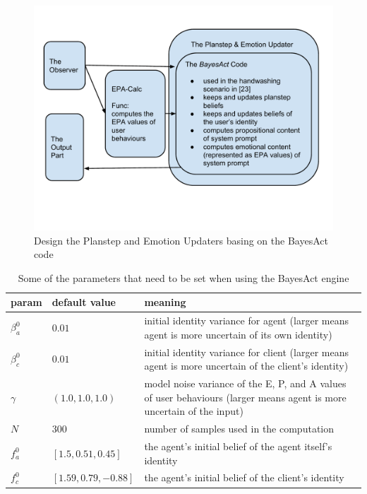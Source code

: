 \begin{figure}[htp]
\centering
\includegraphics[trim = 4mm 30mm 5mm 15mm, clip, width=0.9\linewidth]{fig/fig-updater.pdf}
\caption{Design the Planstep and Emotion Updaters basing on the BayesAct code}
\label{fig:updater}
\end{figure}


\begin{table}
\centering
\caption{Some of the parameters that need to be set when using the BayesAct engine}
\label{table:bayesact-param}
\begin{tabular}{| l | l | p{9.4cm} |}
\hline
param & default value & meaning \\ \hline
$\beta_{a}^{0}$ & $0.01$ & initial identity variance for agent (larger means agent is more uncertain of its own identity) \\ \hline
$\beta_{c}^{0}$ & $0.01$ & initial identity variance for client (larger means agent is more uncertain of the client's identity) \\ \hline
$\gamma$ & $(1.0, 1.0, 1.0)$ & model noise variance of the E, P, and A values of user behaviours (larger means agent is more uncertain of the input) \\ \hline
$N$ & $300$ & number of samples used in the computation \\ \hline
$f_a^{0}$ & $[1.5,0.51,0.45]$ & the agent's initial belief of the agent itself's identity \\ \hline
$f_c^{0}$ & $[1.59,0.79,-0.88]$ & the agent's initial belief of the client's identity \\ \hline
\end{tabular}
\end{table}

